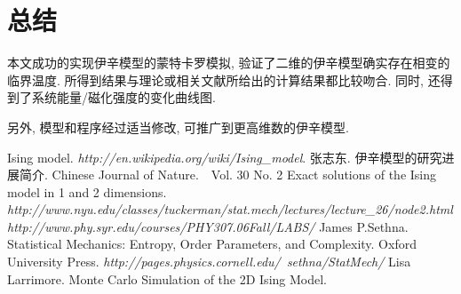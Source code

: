 \documentclass[11pt,a4paper,boxed]{caspset}
\begin{document}
\section{总结}

本文成功的实现伊辛模型的蒙特卡罗模拟, 验证了二维的伊辛模型确实存在相变的临界温度. 所得到结果与理论或相关文献所给出的计算结果都比较吻合. 同时, 还得到了系统能量/磁化强度的变化曲线图.

另外, 模型和程序经过适当修改, 可推广到更高维数的伊辛模型.

\begin{thebibliography}{99}
 Ising model. \textit{http://en.wikipedia.org/wiki/Ising\_model}.
张志东. 伊辛模型的研究进展简介. Chinese Journal of Nature.　Vol. 30 No. 2
Exact solutions of the Ising model in 1 and 2 dimensions.\\ \textit{http://www.nyu.edu/classes/tuckerman/stat.mech/lectures/lecture\_26/node2.html}
 \textit{http://www.phy.syr.edu/courses/PHY307.06Fall/LABS/}
 James P.Sethna. Statistical Mechanics: Entropy, Order Parameters, and Complexity. Oxford University Press. \textit{http://pages.physics.cornell.edu/~sethna/StatMech/}
 Lisa Larrimore. Monte Carlo Simulation of the 2D Ising Model.

\end{thebibliography}
\end{document}
